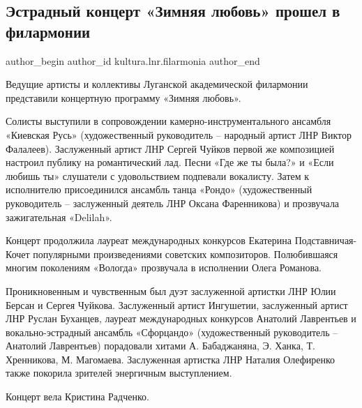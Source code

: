  
 
 
 
 
\subsection{Эстрадный концерт «Зимняя любовь» прошел в филармонии}
\label{sec:16_01_2022.stz.kultura.lnr.filarmonia.1.koncert_zimnjaja_ljubov}
 
\ifcmt
 author_begin
   author_id kultura.lnr.filarmonia
 author_end
\fi

\begin{zznagolos}
Ведущие артисты и коллективы Луганской академической филармонии представили
концертную программу «Зимняя любовь».
\end{zznagolos}

Солисты выступили в сопровождении камерно-инструментального ансамбля «Киевская
Русь» (художественный руководитель – народный артист ЛНР Виктор Фалалеев).
Заслуженный артист ЛНР Сергей Чуйков первой же композицией настроил публику на
романтический лад. Песни «Где же ты была?» и «Если любишь ты» слушатели с
удовольствием подпевали вокалисту. Затем к исполнителю присоединился ансамбль
танца «Рондо» (художественный руководитель – заслуженный деятель ЛНР Оксана
Фаренникова) и прозвучала зажигательная «Delilah».  


Концерт продолжила лауреат международных конкурсов Екатерина Подставничая-Кочет
популярными произведениями советских композиторов. Полюбившаяся многим
поколениям «Вологда» прозвучала в исполнении Олега Романова.  


Проникновенным и чувственным был дуэт заслуженной артистки ЛНР Юлии Берсан и
Сергея Чуйкова. Заслуженный артист Ингушетии, заслуженный артист ЛНР Руслан
Буханцев, лауреат международных конкурсов Анатолий Лаврентьев и
вокально-эстрадный ансамбль «Сфорцандо» (художественный руководитель – Анатолий
Лаврентьев) порадовали хитами А. Бабаджаняна, Э. Ханка, Т. Хренникова, М.
Магомаева. Заслуженная артистка ЛНР Наталия Олефиренко также покорила зрителей
энергичным выступлением.

Концерт вела Кристина Радченко.
